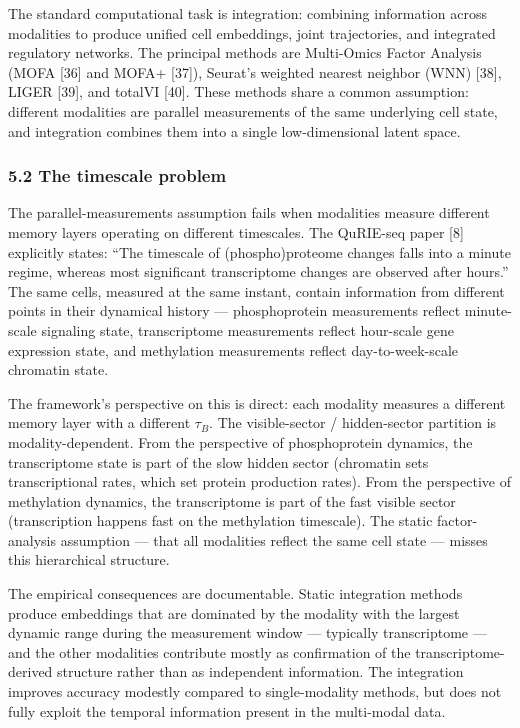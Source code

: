 \documentclass[
]{article}
\begin{document}
The standard computational task is integration: combining information
across modalities to produce unified cell embeddings, joint
trajectories, and integrated regulatory networks. The principal methods
are Multi-Omics Factor Analysis (MOFA {[}36{]} and MOFA+ {[}37{]}),
Seurat's weighted nearest neighbor (WNN) {[}38{]}, LIGER {[}39{]}, and
totalVI {[}40{]}. These methods share a common assumption: different
modalities are parallel measurements of the same underlying cell state,
and integration combines them into a single low-dimensional latent
space.

\hypertarget{the-timescale-problem}{%
\subsubsection{5.2 The timescale problem}\label{the-timescale-problem}}

The parallel-measurements assumption fails when modalities measure
different memory layers operating on different timescales. The QuRIE-seq
paper {[}8{]} explicitly states: ``The timescale of (phospho)proteome
changes falls into a minute regime, whereas most significant
transcriptome changes are observed after hours.'' The same cells,
measured at the same instant, contain information from different points
in their dynamical history --- phosphoprotein measurements reflect
minute-scale signaling state, transcriptome measurements reflect
hour-scale gene expression state, and methylation measurements reflect
day-to-week-scale chromatin state.

The framework's perspective on this is direct: each modality measures a
different memory layer with a different \(\tau_B\). The visible-sector /
hidden-sector partition is modality-dependent. From the perspective of
phosphoprotein dynamics, the transcriptome state is part of the slow
hidden sector (chromatin sets transcriptional rates, which set protein
production rates). From the perspective of methylation dynamics, the
transcriptome is part of the fast visible sector (transcription happens
fast on the methylation timescale). The static factor-analysis
assumption --- that all modalities reflect the same cell state ---
misses this hierarchical structure.

The empirical consequences are documentable. Static integration methods
produce embeddings that are dominated by the modality with the largest
dynamic range during the measurement window --- typically transcriptome
--- and the other modalities contribute mostly as confirmation of the
transcriptome-derived structure rather than as independent information.
The integration improves accuracy modestly compared to single-modality
methods, but does not fully exploit the temporal information present in
the multi-modal data.
\end{document}
